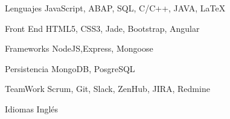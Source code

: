 


\begin{cvskills}


\cvskill
{Lenguajes} %
{JavaScript, ABAP, SQL, C/C++, JAVA, \LaTeX{} } %

\cvskill
{Front End} %
{HTML5, CSS3, Jade, Bootstrap, Angular} %

\cvskill
{Frameworks} %
{NodeJS,Express, Mongoose} %


\cvskill
{Persistencia} %
{MongoDB, PosgreSQL} %

\cvskill
{TeamWork} %
{Scrum, Git, Slack, ZenHub, JIRA, Redmine} %

\cvskill
{Idiomas} %
{Inglés} %


\end{cvskills}

